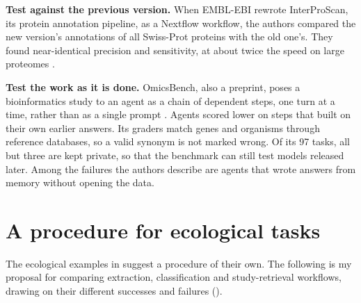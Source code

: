 \textbf{Test against the previous version.} When EMBL-EBI rewrote InterProScan,
its protein annotation pipeline, as a Nextflow workflow, the authors compared
the new version's annotations of all Swiss-Prot proteins with the old one's. They
found near-identical precision and sensitivity, at about twice the speed on large
proteomes \parencite{blum2026interproscan}.

\textbf{Test the work as it is done.} OmicsBench, also a preprint, poses a
bioinformatics study to an agent as a chain of dependent steps, one turn at a
time, rather than as a single prompt \parencite{shaked2026omicsbench}. Agents
scored lower on steps that built on their own earlier answers. Its graders
match genes and organisms through reference databases, so a valid synonym is
not marked wrong. Of its 97 tasks, all but three are kept private, so that the
benchmark can still test models released later. Among the failures the
authors describe are agents that wrote answers from memory without opening the
data.

\section{A procedure for ecological tasks}

The ecological examples in  suggest a procedure of their
own. The following is my proposal for comparing extraction, classification and
study-retrieval workflows, drawing on their different successes and failures
\parencite{gougherty2024extraction,domazetoski2025traits,dorm2026ecologicalknowledge,munch2026phenotypes}
().

